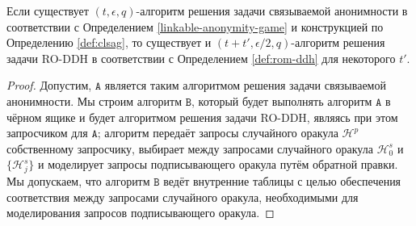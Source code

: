 \documentclass{llncs}
\newcommand{\A}{\texttt{A}}
\newcommand{\B}{\texttt{B}}
\newcommand{\Hp}{\mathcal{H}^p}
\newcommand{\Hs}{\mathcal{H}^s}
\begin{document}
\begin{theorem}
Если существует $(t,\epsilon,q)$-алгоритм решения задачи связываемой анонимности в соответствии с Определением \ref{linkable-anonymity-game} и конструкцией по Определению \ref{def:clsag}, то существует и $(t+t',\epsilon/2,q)$-алгоритм решения задачи RO-DDH в соответствии с Определением \ref{def:rom-ddh} для некоторого $t'$.
\end{theorem}

\begin{proof}
Допустим, $\A$ является таким алгоритмом решения задачи связываемой анонимности. Мы строим алгоритм $\B$, который будет выполнять алгоритм $\A$ в чёрном ящике и будет алгоритмом решения задачи RO-DDH, являясь при этом запросчиком для $\A$; алгоритм передаёт запросы случайного оракула $\Hp$ собственному запросчику, выбирает между запросами случайного оракула $\Hs_0$ и $\{\Hs_j\}$ и моделирует запросы подписывающего оракула путём обратной правки. Мы допускаем, что алгоритм $\B$ ведёт внутренние таблицы с целью обеспечения соответствия между запросами случайного оракула, необходимыми для моделирования запросов подписывающего оракула.


\end{proof}
\end{document}
